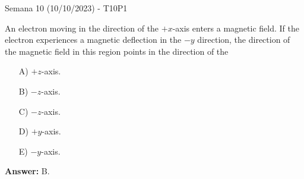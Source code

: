 \begin{frame}{Semana 10 (10/10/2023) - T10P1}

    An electron moving in the direction of the $+x$-axis enters a magnetic field. If the electron experiences a magnetic deflection in the $-y$ direction, the direction of the magnetic field in this region points in the direction of the
   
   \begin{itemize}
       \item[A)] $+z$-axis.
       \item[B)] $-z$-axis.
       \item[C)] $-z$-axis.
       \item[D)] $+y$-axis.
       \item[E)] $-y$-axis.
   \end{itemize}
   
   \pause \centering \textbf{Answer:} B.
    
\end{frame}

